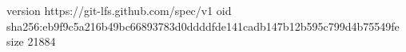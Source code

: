 version https://git-lfs.github.com/spec/v1
oid sha256:eb9f9c5a216b49bc66893783d0ddddfde141cadb147b12b595c799d4b75549fe
size 21884
